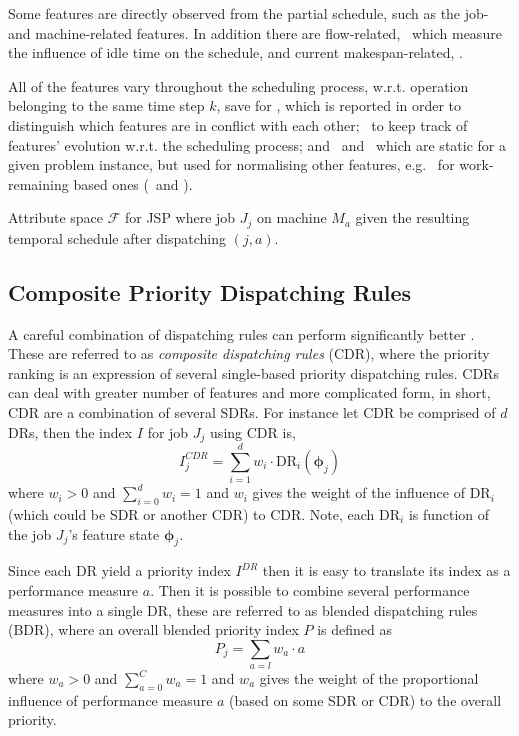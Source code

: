 \documentclass[smallextended]{svjour3}
\renewcommand{\vphi}{\bm \phi}
\begin{document}
	Some features are directly observed from the partial schedule, such as the job- and machine-related features. 
	In addition there are 
	flow-related, \phiFlowRelated\, which measure the influence of idle time on the schedule, 
	and current makespan-related, \phiScheduleRelated.
	
	All of the features vary throughout the scheduling process, w.r.t. operation belonging to the same time step $k$, save for \phimac, 
	which is reported in order to distinguish which features are in conflict with each other; \phistep\ to keep track of features' evolution w.r.t. the scheduling process; and \phitotalProc\ and \phiwrmTotal\ which are static for a given problem instance, but used for normalising other features, e.g. \phiwrmTotal\ for  work-remaining based ones (\phiwrmJob\ and \phiwrmMac). 
	
	\begin{table}[t]  \centering
		\caption[Attribute space $\mathcal{F}$ for JPS]{Attribute space $\mathcal{F}$ for JSP where job $J_j$ on machine $M_a$ given the resulting temporal schedule after dispatching $(j,a)$.
		}
		\label{tbl:jssp:feat}
		
	\end{table}
	
	\subsection{Composite Priority Dispatching Rules}\label{sec:CDR}
	A careful combination of dispatching rules can perform significantly better \cite{Jayamohan04}. These are referred to as \emph{composite dispatching rules} (CDR), where the priority ranking is an expression of several single-based priority dispatching rules. CDRs can deal with greater number of features and more complicated form, in short, CDR are a combination of several SDRs. For instance let CDR be comprised of $d$ DRs, then the index $I$ for job $J_j$ using CDR is, 
	\begin{equation}
	I_j^{CDR} = \sum_{i=1}^d w_i \cdot \text{DR}_i(\vphi_j) \label{eq:CDR}
	\end{equation}
	where $w_i>0$ and $\sum_{i=0}^d w_i = 1$ and $w_i$ gives the weight of the influence of $\text{DR}_i$ (which could be SDR or another CDR) to CDR. Note, each $\text{DR}_i$ is function of the job $J_j$'s feature state $\vphi_j$.
	
	Since each DR yield a priority index $I^{DR}$ then it is easy to translate its index as a  performance measure $a$. Then it is possible to combine several performance measures into a single DR, these are referred to as blended dispatching rules (BDR), where an overall blended priority index $P$ is defined as 
	\begin{equation}
	P_j = \sum_{a=l} w_a \cdot a 
	\end{equation}
	where $w_a>0$ and $\sum_{a=0}^C w_a = 1$ and $w_a$ gives the weight of the proportional influence of performance measure $a$ (based on some SDR or CDR) to the overall priority.
	
\end{document}
